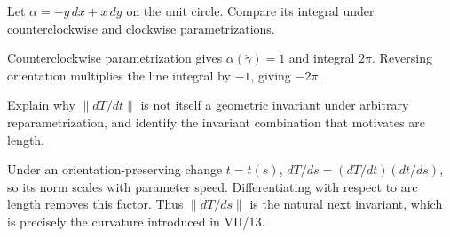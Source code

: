 \begin{problem}\label{prob:vii12-ch04}
Let $\alpha=-y\,dx+x\,dy$ on the unit circle. Compare its integral under counterclockwise and clockwise parametrizations.
\end{problem}
\begin{solution}
Counterclockwise parametrization gives $\alpha(\dot\gamma)=1$ and integral $2\pi$. Reversing orientation multiplies the line integral by $-1$, giving $-2\pi$.
\end{solution}

\begin{problem}\label{prob:vii12-ch05}
Explain why $\|dT/dt\|$ is not itself a geometric invariant under arbitrary reparametrization, and identify the invariant combination that motivates arc length.
\end{problem}
\begin{solution}
Under an orientation-preserving change $t=t(s)$, $dT/ds=(dT/dt)(dt/ds)$, so its norm scales with parameter speed. Differentiating with respect to arc length removes this factor. Thus $\|dT/ds\|$ is the natural next invariant, which is precisely the curvature introduced in VII/13.
\end{solution}
